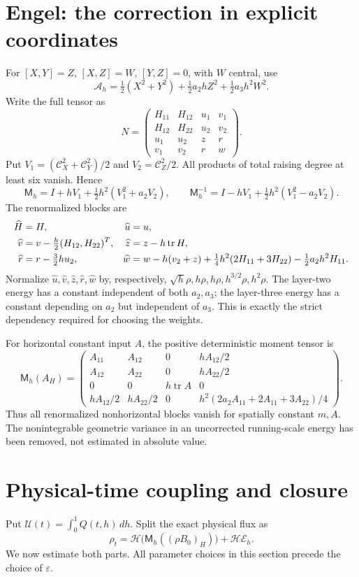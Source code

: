 \documentclass[11pt,a4paper]{amsart}
\numberwithin{equation}{section}
\theoremstyle{remark}\newtheorem{remark}[theorem]{Remark}
\newcommand{\eps}{\varepsilon}
\newcommand{\tr}{\operatorname{tr}}
\newcommand{\cH}{\mathcal H}
\newcommand{\cA}{\mathcal A}
\newcommand{\cC}{\mathcal C}
\newcommand{\cU}{\mathcal U}
\newcommand{\cE}{\mathcal E}
\newcommand{\Mom}{\mathsf M}
\newcommand{\dd}{\,d}
\begin{document}
\section{Engel: the correction in explicit coordinates}
For $[X,Y]=Z$, $[X,Z]=W$, $[Y,Z]=0$, with $W$ central, use
\[
 \cA_h=\tfrac12(X^2+Y^2)+\tfrac12a_2hZ^2+\tfrac12a_3h^2W^2.
\]
Write the full tensor as
\[
 N=\begin{pmatrix}
 H_{11}&H_{12}&u_1&v_1\\
 H_{12}&H_{22}&u_2&v_2\\
 u_1&u_2&z&r\\
 v_1&v_2&r&w
 \end{pmatrix}.
\]
Put $V_1=(\cC_X^2+\cC_Y^2)/2$ and $V_2=\cC_Z^2/2$. All products of total
raising degree at least six vanish. Hence
\[
 \Mom_h=I+hV_1+\tfrac12h^2(V_1^2+a_2V_2),\qquad
 \Mom_h^{-1}=I-hV_1+\tfrac12h^2(V_1^2-a_2V_2).
\]
The renormalized blocks are
\begin{align}
 \widehat H&=H,& \widehat u&=u,\notag\\
 \widehat v&=v-\tfrac h2(H_{12},H_{22})^T,&
 \widehat z&=z-h\tr H,\notag\\
 \widehat r&=r-\tfrac32h u_2,&
 \widehat w&=w-h(v_2+z)+\tfrac14h^2(2H_{11}+3H_{22})
                         -\tfrac12a_2h^2H_{11}.\label{eq:engel-corrections}
\end{align}
Normalize $\widehat u,\widehat v,\widehat z,\widehat r,\widehat w$ by,
respectively, $\sqrt h\rho,h\rho,h\rho,h^{3/2}\rho,h^2\rho$.
The layer-two energy has a constant independent of both $a_2,a_3$; the
layer-three energy has a constant depending on $a_2$ but independent of $a_3$.
This is exactly the strict dependency required for choosing the weights.

For horizontal constant input $A$, the positive deterministic moment tensor is
\[
 \Mom_h(A_H)=
 \begin{pmatrix}
 A_{11}&A_{12}&0&hA_{12}/2\\
 A_{12}&A_{22}&0&hA_{22}/2\\
 0&0&h\tr A&0\\
 hA_{12}/2&hA_{22}/2&0&h^2(2a_2A_{11}+2A_{11}+3A_{22})/4
 \end{pmatrix}.
\]
Thus all renormalized nonhorizontal blocks vanish for spatially constant
$m,A$. The nonintegrable geometric variance in an uncorrected running-scale
energy has been removed, not estimated in absolute value.

\section{Physical-time coupling and closure}
Put $\cU(t)=\int_0^1Q(t,h)\dd h$. Split the exact physical flux as
\[
 \rho_t=\cH\big(\Mom_h((\rho B_0)_H)\big)+\cH\cE_h.
\]
We now estimate both parts. All parameter choices in this section precede the
choice of $\eps$.
\end{document}
